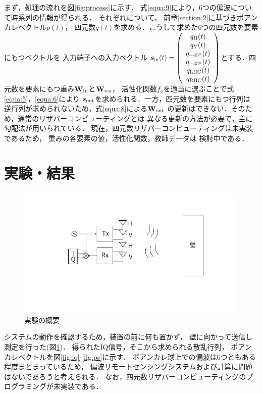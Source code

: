 \documentclass[uplatex,a4paper,12pt]{jsarticle}
\begin{document}
まず，処理の流れを図\ref{fig:process}に示す．
式\ref{equa:9}により，6つの偏波について時系列の情報が得られる．
それぞれについて，
前章\ref{section:2}に基づきポアンカレベクトル$p(t)$，
四元数$q(t)$を求める．こうして求めた6つの四元数を要素にもつベクトルを
入力端子への入力ベクトル
$\bm{s}_{\rm{in}}(t) = 
\left(
    \begin{array}{c}
        q_{\rm{H}}(t)\\
        q_{\rm{V}}(t)\\
        q_{+45^\circ}(t)\\
        q_{-45^\circ}(t)\\
        q_{\rm{LHC}}(t)\\
        q_{\rm{RHC}}(t)
    \end{array}
\right)$とする．四元数を要素にもつ重み$\bf{W_{\rm{in}}}$と$\bf{W_{\rm{res}}}$，
活性化関数$f_a$を適当に選ぶことで式\ref{equa:5}，\ref{equa:6}により
$\bm{s}_{\rm{out}}$を求められる．一方，四元数を要素にもつ行列は
逆行列が求められないため，式\ref{equa:8}による$\bf{W_{\rm{out}}}$
の更新はできない．そのため，通常のリザバーコンピューティングとは
異なる更新の方法が必要で，主に勾配法が用いられている\cite{quaternion1}\cite{quaternion2}．
現在，四元数リザバーコンピューティングは未実装であるため，
重みの各要素の値，活性化関数，教師データは
検討中である．


\section{実験・結果}
\begin{figure}[hbtp]
	\centering
	\includegraphics[scale=0.4]{../img/exp.png}
    \caption{実験の概要}
	\label{fig:exp}
\end{figure}

システムの動作を確認するため，装置の前に何も置かず，
壁に向かって送信し測定を行った(図\ref{fig:exp})．
得られたIQ信号，そこから求められる散乱行列，
ポアンカレベクトルを図\ref{fig:iq}-\ref{fig:ps}に示す．
ポアンカレ球上での偏波は6つともある程度まとまっているため，
偏波リモートセンシングシステムおよび計算に問題はないであろうと考えられる．
なお，四元数リザバーコンピューティングのプログラミングが未実装である．
\end{document}
